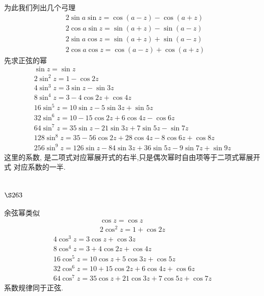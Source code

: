 为此我们列出几个弓理
\[
\begin{aligned}
& 2 \sin a \sin z=\cos (a-z)-\cos (a+z) \\
& 2 \cos a \sin z=\sin (a+z)-\sin (a-z) \\
& 2 \sin a \cos z=\sin (a+z)+\sin (a-z) \\
& 2 \cos a \cos z=\cos (a-z)+\cos (a+z)
\end{aligned}
\]
先求正弦的幂
\[
\begin{gathered}
\sin z=\sin z \\
2 \sin ^{2} z=1-\cos 2 z \\
4 \sin ^{3} z=3 \sin z-\sin 3 z \\
8 \sin ^{4} z=3-4 \cos 2 z+\cos 4 z \\
16 \sin ^{5} z=10 \sin z-5 \sin 3 z+\sin 5 z \\
32 \sin ^{6} z=10-15 \cos 2 z+6 \cos 4 z-\cos 6 z \\
64 \sin ^{7} z=35 \sin z-21 \sin 3 z+7 \sin 5 z-\sin 7 z \\
128 \sin ^{8} z=35-56 \cos 2 z+28 \cos 4 z-8 \cos 6 z+\cos 8 z \\
256 \sin ^{9} z=126 \sin z-84 \sin 3 z+36 \sin 5 z-9 \sin 7 z+\sin 9 z
\end{gathered}
\]
这里的系数, 是二项式对应幂展开式的右半,只是偶次幂时自由项等于二项式幂展开式 对应系数的一半.

\section{$\S 263$}

余弦幂类似
\[
\begin{gathered}
\cos z=\cos z \\
2 \cos ^{2} z=1+\cos 2 z
\end{gathered}
\]
\[
\begin{gathered}
4 \cos ^{3} z=3 \cos z+\cos 3 z \\
8 \cos ^{4} z=3+4 \cos 2 z+\cos 4 z \\
16 \cos ^{5} z=10 \cos z+5 \cos 3 z+\cos 5 z \\
32 \cos ^{6} z=10+15 \cos 2 z+6 \cos 4 z+\cos 6 z \\
64 \cos ^{7} z=35 \cos z+21 \cos 3 z+7 \cos 5 z+\cos 7 z
\end{gathered}
\]
系数规律同于正弦. 

